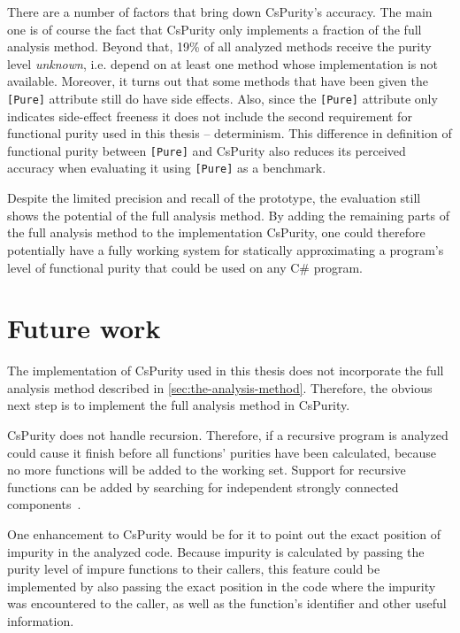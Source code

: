 \documentclass[a4paper,12pt]{article}
\begin{document}
There are a number of factors that bring down CsPurity's accuracy. The main one is of course the fact that CsPurity only implements a fraction of the full analysis method. Beyond that, 19\% of all analyzed methods receive the purity level \textit{unknown}, i.e. depend on at least one method whose implementation is not available. Moreover, it turns out that some methods that have been given the \texttt{[Pure]} attribute still do have side effects. Also, since the \texttt{[Pure]} attribute only indicates side-effect freeness it does not include the second requirement for functional purity used in this thesis -- determinism. This difference in definition of functional purity between \texttt{[Pure]} and CsPurity also reduces its perceived accuracy when evaluating it using \texttt{[Pure]} as a benchmark.

Despite the limited precision and recall of the prototype, the evaluation still shows the potential of the full analysis method. By adding the remaining parts of the full analysis method to the implementation CsPurity, one could therefore potentially have a fully working system for statically approximating a program's level of functional purity that could be used on any C\# program.

\section{Future work} \label{sec:future-work}

The implementation of CsPurity used in this thesis does not incorporate the full analysis method described in \autoref{sec:the-analysis-method}. Therefore, the obvious next step is to implement the full analysis method in CsPurity.

CsPurity does not handle recursion. Therefore, if a recursive program is analyzed could cause it finish before all functions' purities have been calculated, because no more functions will be added to the working set. Support for recursive functions can be added by searching for independent strongly connected components~\cite{pitidis2010purity}.

One enhancement to CsPurity would be for it to point out the exact position of impurity in the analyzed code. Because impurity is calculated by passing the purity level of impure functions to their callers, this feature could be implemented by also passing the exact position in the code where the impurity was encountered to the caller, as well as the function's identifier and other useful information.
\end{document}
